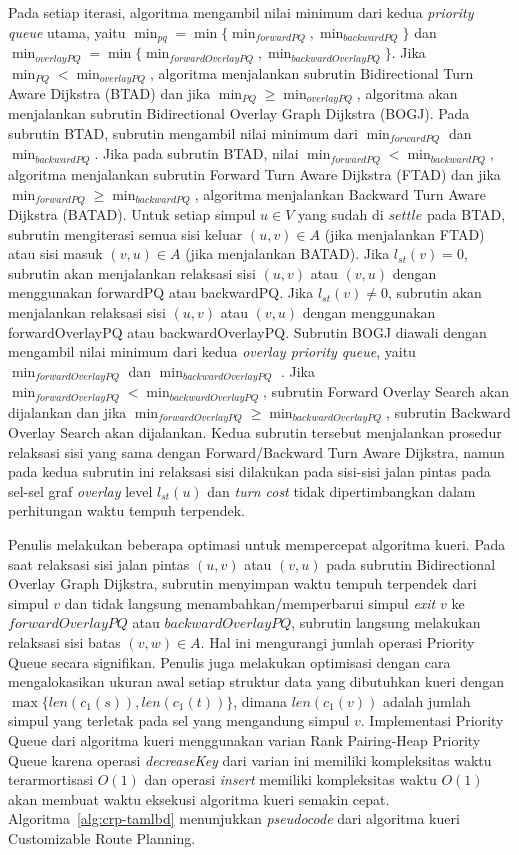 Pada setiap iterasi, algoritma mengambil nilai minimum dari kedua \textit{priority queue} utama, yaitu $\min_{pq}=\min\{\min_{forwardPQ}, \min_{backwardPQ}\}$ dan $\min_{overlayPQ}=\min\{\min_{forwardOverlayPQ}, \min_{backwardOverlayPQ}\}$. Jika $\min_{PQ} < \min_{overlayPQ}$, algoritma menjalankan subrutin Bidirectional Turn Aware Dijkstra (BTAD) dan jika $\min_{PQ} \geq \min_{overlayPQ}$, algoritma akan menjalankan subrutin Bidirectional Overlay Graph Dijkstra (BOGJ). Pada subrutin BTAD, subrutin mengambil nilai minimum dari $\min_{forwardPQ}$ dan $\min_{backwardPQ}$. Jika pada subrutin BTAD, nilai $\min_{forwardPQ}<\min_{backwardPQ}$, algoritma menjalankan subrutin Forward Turn Aware Dijkstra (FTAD) dan jika $\min_{forwardPQ}\geq\min_{backwardPQ}$, algoritma menjalankan Backward Turn Aware Dijkstra (BATAD). Untuk setiap simpul $u\in V$ yang sudah di $settle$ pada BTAD, subrutin mengiterasi semua sisi keluar $(u,v)\in A$ (jika menjalankan FTAD) atau sisi masuk $(v,u)\in A$ (jika menjalankan BATAD). Jika $l_{st}(v)=0$, subrutin akan menjalankan relaksasi sisi $(u,v)$ atau $(v,u)$ dengan menggunakan forwardPQ atau backwardPQ. Jika $l_{st}(v)\neq 0$, subrutin akan menjalankan relaksasi sisi  $(u,v)$ atau $(v,u)$ dengan menggunakan forwardOverlayPQ atau backwardOverlayPQ. Subrutin BOGJ diawali dengan mengambil nilai minimum dari kedua \textit{overlay priority queue}, yaitu $\min_{forwardOverlayPQ}$ dan $\min_{backwardOverlayPQ}$ . Jika  $\min_{forwardOverlayPQ} <\min_{backwardOverlayPQ}$, subrutin Forward Overlay Search akan dijalankan dan jika $\min_{forwardOverlayPQ} \geq \min_{backwardOverlayPQ}$, subrutin Backward Overlay Search akan dijalankan. Kedua subrutin tersebut menjalankan prosedur relaksasi sisi yang sama dengan Forward/Backward Turn Aware Dijkstra, namun pada kedua subrutin ini relaksasi sisi dilakukan pada sisi-sisi jalan pintas pada sel-sel graf \textit{overlay} level $l_{st}(u)$ dan \textit{turn cost} tidak dipertimbangkan dalam perhitungan waktu tempuh terpendek.

Penulis melakukan beberapa optimasi untuk mempercepat algoritma kueri. Pada saat relaksasi sisi jalan pintas $(u,v)$ atau $(v,u)$ pada subrutin Bidirectional Overlay Graph Dijkstra, subrutin menyimpan waktu tempuh terpendek dari simpul $v$ dan tidak langsung menambahkan/memperbarui simpul \textit{exit} $v$ ke $forwardOverlayPQ$ atau $backwardOverlayPQ$, subrutin langsung melakukan relaksasi sisi batas $(v,w)\in A$. Hal ini mengurangi jumlah operasi Priority Queue secara signifikan. Penulis juga melakukan optimisasi dengan cara mengalokasikan ukuran awal setiap struktur data yang dibutuhkan kueri dengan $\max\{len(c_1(s)),len(c_1(t))\}$, dimana $len(c_1(v))$ adalah jumlah simpul yang terletak pada sel yang mengandung simpul $v$. Implementasi Priority Queue dari algoritma kueri menggunakan varian Rank Pairing-Heap Priority Queue \cite{Haeupler2009} karena operasi \textit{decreaseKey} dari varian ini memiliki kompleksitas waktu terarmortisasi $O(1)$ dan operasi \textit{insert} memiliki kompleksitas waktu $O(1)$ akan membuat waktu eksekusi algoritma kueri semakin cepat. Algoritma~\ref{alg:crp-tamlbd} menunjukkan \textit{pseudocode} dari algoritma kueri Customizable Route Planning.


